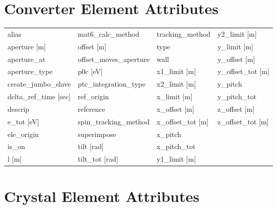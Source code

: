  \section{Converter Element Attributes}
 \label{s:list.converter}

 \begin{tabular}{llll} \toprule
alias                          & mat6_calc_method               & tracking_method                & y2_limit [m]                   \\
aperture [m]                   & offset [m]                     & type                           & y_limit [m]                    \\
aperture_at                    & offset_moves_aperture          & wall                           & y_offset [m]                   \\
aperture_type                  & p0c [eV]                       & x1_limit [m]                   & y_offset_tot [m]               \\
create_jumbo_slave             & ptc_integration_type           & x2_limit [m]                   & y_pitch                        \\
delta_ref_time [sec]           & ref_origin                     & x_limit [m]                    & y_pitch_tot                    \\
descrip                        & reference                      & x_offset [m]                   & z_offset [m]                   \\
e_tot [eV]                     & spin_tracking_method           & x_offset_tot [m]               & z_offset_tot [m]               \\
ele_origin                     & superimpose                    & x_pitch                        &                                \\
is_on                          & tilt [rad]                     & x_pitch_tot                    &                                \\
l [m]                          & tilt_tot [rad]                 & y1_limit [m]                   &                                \\
 \bottomrule
 \end{tabular}
 \vfill

 \section{Crystal Element Attributes}
 \label{s:list.crystal}

